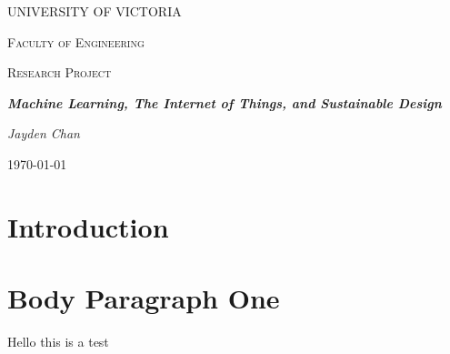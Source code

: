 \documentclass[letterpaper]{article}
\begin{document}
\begin{titlepage}
    \centering
    {\scshape\huge UNIVERSITY OF VICTORIA \par}
    \vspace{1cm}
    {\scshape\LARGE Faculty of Engineering \par}
    \vspace{1cm}
    {\scshape\Large Research Project \par}
    \vspace{1.5cm}
    {\huge\bfseries \emph{Machine Learning, The Internet of Things, and Sustainable Design} \par}
    \vspace{2cm}
    {\Large\itshape Jayden Chan \par}
    \vfill
    {\large \today\par}
\end{titlepage}
\pagestyle{pageOne}

\section{Introduction}
\blindtext
\section{Body Paragraph One}
\blindtext
\blindtext
\blindtext

Hello this is a test
\pagestyle{normalPage}
\end{document}
